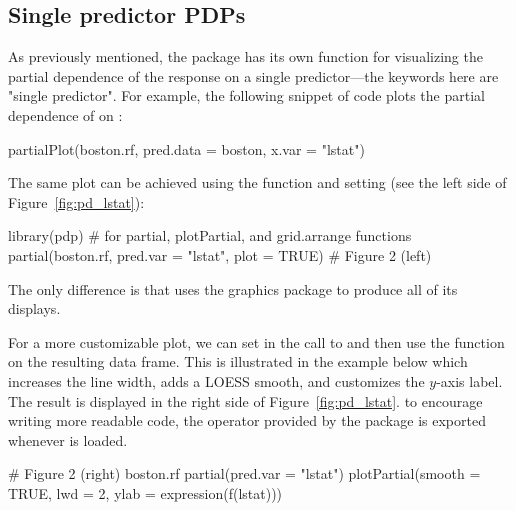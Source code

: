 \subsection{Single predictor PDPs}

As previously mentioned, the  package has its own  function for visualizing the partial dependence of the response on a single predictor---the keywords here are "single predictor". For example, the following snippet of code plots the partial dependence of  on :
\begin{example}
partialPlot(boston.rf, pred.data = boston, x.var = "lstat")
\end{example}
The same plot can be achieved using the  function and setting  (see the left side of Figure~\ref{fig:pd_lstat}):
\begin{example}
library(pdp)  # for partial, plotPartial, and grid.arrange functions
partial(boston.rf, pred.var = "lstat", plot = TRUE)  # Figure 2 (left)
\end{example}
The only difference is that  uses the  graphics package to produce all of its displays.

For a more customizable plot, we can set  in the call to  and then use the  function on the resulting data frame. This is illustrated in the example below which increases the line width, adds a LOESS smooth, and customizes the $y$-axis label. The result is displayed in the right side of Figure~\ref{fig:pd_lstat}.  to encourage writing more readable code, the  operator \code{\%>\%} provided by the  package \citep{magrittr-pkg} is exported whenever  is loaded.
\begin{example}
# Figure 2 (right)
boston.rf %
  partial(pred.var = "lstat") %
  plotPartial(smooth = TRUE, lwd = 2, ylab = expression(f(lstat)))
\end{example}

